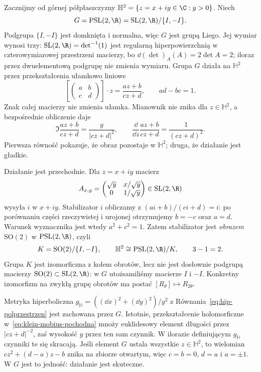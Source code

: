 \begin{przyklad}
\label{prz:klein-dysk}
Zacznijmy od górnej półpłaszczyzny
$\mathbb H^2=\{z=x+iy\in\C:y>0\}$. Niech
\[
 G=\mathrm{PSL}(2,\R)
 =\mathrm{SL}(2,\R)/\{I,-I\}.
\]
Podgrupa $\{I,-I\}$ jest domknięta i normalna,
więc $G$ jest grupą Liego. Jej wymiar wynosi trzy:
$\mathrm{SL}(2,\R)=\det^{-1}(1)$ jest regularną
hiperpowierzchnią w czterowymiarowej przestrzeni
macierzy, bo $\dd(\det)_A(A)=2\det A=2$;
iloraz przez dwuelementową podgrupę
nie zmienia wymiaru. Grupa $G$ działa na
$\mathbb H^2$ przez przekształcenia ułamkowo liniowe
\[
 \left[\begin{pmatrix}a&b\\c&d\end{pmatrix}\right]
 \cdot z=\frac{az+b}{cz+d},\qquad ad-bc=1.
\]
Znak całej macierzy nie zmienia ułamka. Mianownik
nie znika dla $z\in\mathbb H^2$, a bezpośrednie obliczenie daje
\begin{equation}\label{eq:klein-mobius-pochodna}
 \Im\frac{az+b}{cz+d}=\frac{y}{|cz+d|^2},
 \qquad
 \frac{\dd}{\dd z}\frac{az+b}{cz+d}
 =\frac1{(cz+d)^2}.
\end{equation}
Pierwsza równość pokazuje, że obraz pozostaje w
$\mathbb H^2$; druga, że działanie jest gładkie.

Działanie jest przechodnie. Dla $z=x+iy$ macierz
\[
 A_{x,y}=\begin{pmatrix}
 \sqrt y&x/\sqrt y\\0&1/\sqrt y
 \end{pmatrix}\in\mathrm{SL}(2,\R)
\]
wysyła $i$ w $x+iy$. Stabilizator $i$ obliczamy z
$(ai+b)/(ci+d)=i$: po porównaniu części rzeczywistej
i urojonej otrzymujemy $b=-c$ oraz $a=d$.
Warunek wyznacznika jest wtedy $a^2+c^2=1$.
Zatem stabilizator jest \emph{obrazem} $\mathrm{SO}(2)$
w $\mathrm{PSL}(2,\R)$, czyli
\[
 K=\mathrm{SO}(2)/\{I,-I\},\qquad
 \mathbb H^2\cong\mathrm{PSL}(2,\R)/K,
 \qquad 3-1=2.
\]
Grupa $K$ jest izomorficzna z kołem obrotów,
lecz nie jest dosłownie podgrupą macierzy
$\mathrm{SO}(2)\subset\mathrm{SL}(2,\R)$: w $G$
utożsamiliśmy macierze $I$ i $-I$. Konkretny izomorfizm
na zwykłą grupę obrotów ma postać $[R_\theta]\mapsto R_{2\theta}$.

Metryka hiperboliczna
$g_{\mathbb H}=((\dd x)^2+(\dd y)^2)/y^2$ z
Równania~\eqref{eq:hip-polprzestrzen} jest zachowana
przez $G$. Istotnie, przekształcenie holomorficzne
w~\eqref{eq:klein-mobius-pochodna} mnoży euklidesowy
element długości przez $|cz+d|^{-2}$, zaś wysokość
$y$ przez ten sam czynnik. W ilorazie definiującym
$g_{\mathbb H}$ czynniki te się skracają.
Jeśli element $G$ ustala wszystkie $z\in\mathbb H^2$,
to wielomian
$cz^2+(d-a)z-b$ znika na zbiorze otwartym, więc
$c=b=0$, $d=a$ i $a=\pm1$. W $G$ jest to jedność:
działanie jest skuteczne.


\end{przyklad}
